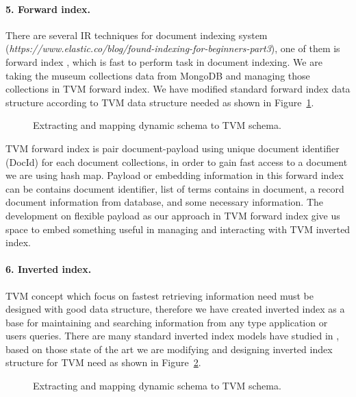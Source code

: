 \paragraph{5. Forward index.} There are several IR techniques for document indexing system (\textit{https://www.elastic.co/blog/found-indexing-for-beginners-part3}), one of them is forward index \cite{BrinPage}, which is fast to perform task in document indexing. We are taking the museum collections data from MongoDB and managing those collections in TVM forward index. We have modified standard forward index data structure according to TVM data structure needed as shown in Figure~\cref{fig:tvmForwardIndex}.

\begin{figure}[ht]
	\caption{Extracting and mapping dynamic schema to TVM schema.}\label{fig:tvmForwardIndex}
\end{figure}

TVM forward index is pair document-payload using unique document identifier (DocId) for each document collections, in order to gain fast access to a document we are using hash map. Payload or embedding information in this forward index can be contains document identifier, list of terms contains in document, a record document information from database, and some necessary information. The development on flexible payload as our approach in TVM forward index give us space to embed something useful in managing and interacting with TVM inverted index.

\paragraph{6. Inverted index.} TVM concept which focus on fastest retrieving information need must be designed with good data structure, therefore we have created inverted index as a base for maintaining and searching information from any type application or users queries. There are many standard inverted index models have studied in \cite{ZobelMoffat,ManningRaghavanSchutze,PanevBerberich}, based on those state of the art we are modifying and designing inverted index structure for TVM need \cite{AnggaiBlekanovSergeev2017} as shown in Figure~\cref{fig:tvmInvertedIndex}.

\begin{figure}[ht]
	\caption{Extracting and mapping dynamic schema to TVM schema.}\label{fig:tvmInvertedIndex}
\end{figure}

